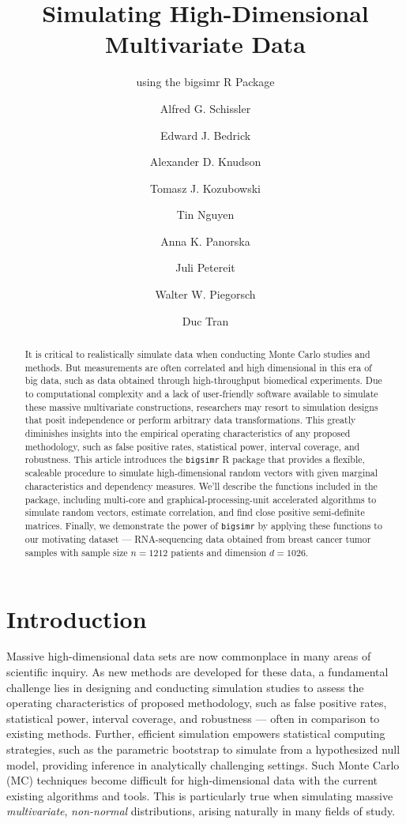 \documentclass[]{article}
\title{Simulating High-Dimensional Multivariate Data}
\subtitle{using the bigsimr R Package}
\author{Alfred G. Schissler \and Edward J. Bedrick \and Alexander D. Knudson \and Tomasz J. Kozubowski \and Tin Nguyen \and Anna K. Panorska \and Juli Petereit \and Walter W. Piegorsch \and Duc Tran}
\date{}
\begin{document}
\maketitle
\begin{abstract}
It is critical to realistically simulate data when conducting Monte Carlo studies and methods. But measurements are often correlated and high dimensional in this era of big data, such as data obtained through high-throughput biomedical experiments. Due to computational complexity and a lack of user-friendly software available to simulate these massive multivariate constructions, researchers may resort to simulation designs that posit independence or perform arbitrary data transformations. This greatly diminishes insights into the empirical operating characteristics of any proposed methodology, such as false positive rates, statistical power, interval coverage, and robustness. This article introduces the \texttt{bigsimr} R package that provides a flexible, scaleable procedure to simulate high-dimensional random vectors with given marginal characteristics and dependency measures. We'll describe the functions included in the package, including multi-core and graphical-processing-unit accelerated algorithms to simulate random vectors, estimate correlation, and find close positive semi-definite matrices. Finally, we demonstrate the power of \texttt{bigsimr} by applying these functions to our motivating dataset --- RNA-sequencing data obtained from breast cancer tumor samples with sample size \(n=1212\) patients and dimension \(d =1026\).
\end{abstract}

\hypertarget{introduction}{%
\section{Introduction}\label{introduction}}

Massive high-dimensional data sets are now commonplace in many areas of scientific inquiry.
As new methods are developed for these data, a fundamental challenge lies in designing and conducting simulation studies to assess the operating characteristics of proposed methodology, such as false positive rates, statistical power, interval coverage, and robustness --- often in comparison to existing methods.
Further, efficient simulation empowers statistical computing strategies, such as the parametric bootstrap \citep{Rizzo2007} to simulate from a hypothesized null model, providing inference in analytically challenging settings.
Such Monte Carlo (MC) techniques become difficult for high-dimensional data with the current existing algorithms and tools.
This is particularly true when simulating massive \emph{multivariate}, \emph{non-normal} distributions, arising naturally in many fields of study.
\end{document}
